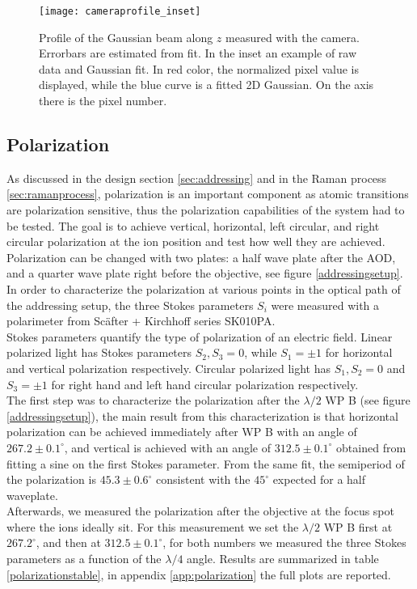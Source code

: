 \begin{figure}
\centering
\texttt{[image: cameraprofile\_inset]}
\caption{Profile of the Gaussian beam along $z$ measured with the camera. Errorbars are estimated from fit. In the inset an example of raw data and Gaussian fit. In red color, the normalized pixel value is displayed, while the blue curve is a fitted 2D Gaussian. On the axis there is the pixel number.}
\label{cameraprofile}
\end{figure}

\subsection{Polarization}
\label{sec:polarization}
As discussed in the design section \ref{sec:addressing} and in the Raman process \ref{sec:ramanprocess}, polarization is an important component as atomic transitions are polarization sensitive, thus the polarization capabilities of the system had to be tested. The goal is to achieve vertical, horizontal, left circular, and right circular polarization at the ion position and test how well they are achieved. Polarization can be changed with two plates: a half wave plate after the AOD, and a quarter wave plate right before the objective, see figure \ref{addressingsetup}. In order to characterize the polarization at various points in the optical path of the addressing setup, the three Stokes parameters $S_i$ \cite{stokes} were measured with a polarimeter from Sc\"after + Kirchhoff series SK010PA.\\
Stokes parameters quantify the type of polarization of an electric field. Linear polarized light has Stokes parameters $S_2,S_3 = 0$, while $S_1 = \pm 1$ for horizontal and vertical polarization respectively. Circular polarized light has $S_1, S_2 = 0$ and $S_3=\pm 1$ for right hand and left hand circular polarization respectively.\\
The first step was to characterize the polarization after the $\lambda/2$ WP B (see figure \ref{addressingsetup}), the main result from this characterization is that horizontal polarization can be achieved immediately after WP B with an angle of $267.2\pm 0.1 ^{\circ}$, and vertical is achieved with an angle of $312.5\pm0.1^{\circ}$ obtained from fitting a sine on the first Stokes parameter. From the same fit, the semiperiod of the polarization is $45.3\pm 0.6^\circ$ consistent with the $45^\circ$ expected for a half waveplate.\\
Afterwards, we measured the polarization after the objective at the focus spot where the ions ideally sit. For this measurement we set the $\lambda/2$ WP B first at $267.2^\circ$, and then at $312.5\pm0.1^{\circ}$, for both numbers we measured the three Stokes parameters as a function of the $\lambda/4$ angle. Results are summarized in table \ref{polarizationstable}, in appendix \ref{app:polarization} the full plots are reported.

